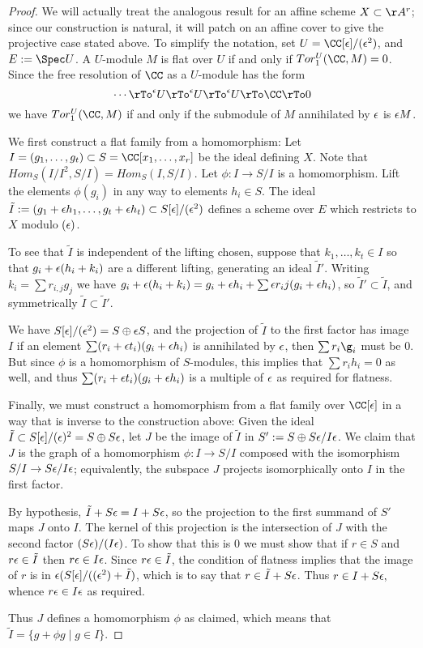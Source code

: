 \begin{proof}
We will actually treat the analogous result for an affine scheme $X \subset \AA^r$; since our construction is natural, it will patch on an affine cover to give the projective case stated above. To simplify the notation, set $U = \CC[\eps]/(\eps^2)$,
and $E:= \Spec U$.
A $U$-module $M$ is flat  over $U$ if and only if $Tor_1^U(\CC,M) = 0$. 
Since the free resolution of $\CC$ as a $U$-module has the form
$$
\cdots \rTo^\eps U \rTo^\eps U \rTo^\eps U \rTo \CC \rTo 0
$$
we have $Tor_1^U(\CC,M)$ if and only if the submodule of $M$ annihilated by $\eps$ is $\eps M$.

We first construct a flat family from a homomorphism: Let $I = (g_1,\dots, g_t)\subset S = \CC[x_1,\dots, x_r]$ be the ideal defining $X$. 
Note that $Hom_S(I/I^2, S/I) = Hom_S(I,S/I)$. Let $\phi: I\to S/I$ is a homomorphism. Lift the elements $\phi(g_i)$ in any way to elements
$h_i \in S.$ The ideal
$\tilde I := (g_1+\eps h_1,\dots, g_t+\eps h_t)\subset S[\eps]/(\eps^2)$
defines a scheme over $E$ which restricts to $X$ modulo $(\eps)$. 

To see that $\tilde I$ is 
independent of the lifting chosen, suppose that $k_1,\dots,k_t\in I$ so that $g_i+\eps(h_i+k_i)$ are a different lifting,
generating an ideal $\tilde I'$.
Writing $k_i = \sum r_{i,j}g_j$ we have $g_i+\eps(h_i+k_i) = g_i+\eps h_i+ \sum \eps r_ij(g_i+\eps h_i)$, so 
$\tilde I' \subset \tilde I$, and symmetrically $\tilde I \subset \tilde I'$.

We have $S[\eps]/(\eps^2) = S \oplus \eps S$, and the projection of $\tilde I$ to the first factor has image $I$
if an element $\sum (r_i+\eps t_i)(g_i+\eps h_i)$ is annihilated by $\eps$, then $\sum r_i\g_i$ must be 0. But
since $\phi$ is a homomorphism of $S$-modules, this implies that $\sum r_i h_i = 0$ as well, and thus
$\sum (r_i+\eps t_i)(g_i+\eps h_i)$ is a multiple of $\eps$ as required for flatness.

Finally, we must construct a homomorphism from a flat family over $\CC[\eps]$ in a way that is inverse to the construction above: Given the ideal $\tilde I \subset S[\eps]/(\eps)^2 = S\oplus S\eps$,
let $J$ be the image of $\tilde I$ in $S':= S\oplus S\eps/I\eps$. We claim that $J$ is the graph of a homomorphism $\phi: I \to  S/I$
composed with the isomorphism $S/I \to S\eps/I\eps$; equivalently, the subspace $J$ projects isomorphically onto $I$ in the first factor. 

By hypothesis, $\tilde I + S\eps = I +S\eps$, so the projection  to the first  summand of $S'$ maps $J$ onto $I$. The kernel of this projection is
the intersection of $J$ with the second factor $(S\eps )/(I\eps )$. To show that this is 0 we must show that
if $r\in S$ and $r\eps \in \tilde I$ then $r\eps \in I\eps$. Since $r\eps \in \tilde I$, the condition of flatness implies
that the image of $r$ is in $\eps(S[\eps]/((\eps^2)+\tilde I)$, which is to say that $r \in \tilde I + S\eps$.
Thus $r \in  I + S\eps,$ whence $r\eps \in I\eps$ as required.

Thus
$J$ defines a homomorphism $\phi$ as claimed, which means that
 $\tilde I = \{g+\phi g\mid g\in I\}$.
\end{proof}




